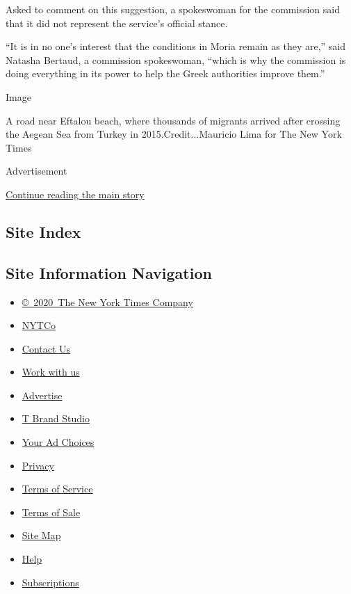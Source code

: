 Asked to comment on this suggestion, a spokeswoman for the commission
said that it did not represent the service's official stance.

``It is in no one's interest that the conditions in Moria remain as they
are,'' said Natasha Bertaud, a commission spokeswoman, ``which is why
the commission is doing everything in its power to help the Greek
authorities improve them.''

Image

A road near Eftalou beach, where thousands of migrants arrived after
crossing the Aegean Sea from Turkey in 2015.Credit...Mauricio Lima for
The New York Times

Advertisement

\protect\hyperlink{after-bottom}{Continue reading the main story}

\hypertarget{site-index}{%
\subsection{Site Index}\label{site-index}}

\hypertarget{site-information-navigation}{%
\subsection{Site Information
Navigation}\label{site-information-navigation}}

\begin{itemize}
\tightlist
\item
  \href{https://help.nytimes3xbfgragh.onion/hc/en-us/articles/115014792127-Copyright-notice}{©~2020~The
  New York Times Company}
\end{itemize}

\begin{itemize}
\tightlist
\item
  \href{https://www.nytco.com/}{NYTCo}
\item
  \href{https://help.nytimes3xbfgragh.onion/hc/en-us/articles/115015385887-Contact-Us}{Contact
  Us}
\item
  \href{https://www.nytco.com/careers/}{Work with us}
\item
  \href{https://nytmediakit.com/}{Advertise}
\item
  \href{http://www.tbrandstudio.com/}{T Brand Studio}
\item
  \href{https://www.nytimes3xbfgragh.onion/privacy/cookie-policy\#how-do-i-manage-trackers}{Your
  Ad Choices}
\item
  \href{https://www.nytimes3xbfgragh.onion/privacy}{Privacy}
\item
  \href{https://help.nytimes3xbfgragh.onion/hc/en-us/articles/115014893428-Terms-of-service}{Terms
  of Service}
\item
  \href{https://help.nytimes3xbfgragh.onion/hc/en-us/articles/115014893968-Terms-of-sale}{Terms
  of Sale}
\item
  \href{https://spiderbites.nytimes3xbfgragh.onion}{Site Map}
\item
  \href{https://help.nytimes3xbfgragh.onion/hc/en-us}{Help}
\item
  \href{https://www.nytimes3xbfgragh.onion/subscription?campaignId=37WXW}{Subscriptions}
\end{itemize}
